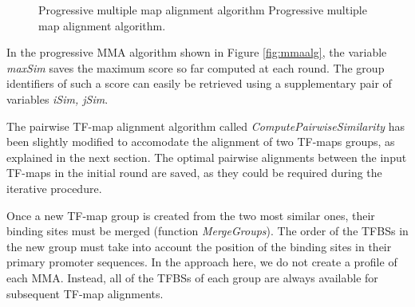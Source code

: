 \begin{figure}[t!]
\begin{center}
          {Progressive multiple map alignment algorithm}%
          {Progressive multiple map alignment algorithm.}%
          {}
\end{center}
\end{figure}



In the progressive MMA algorithm shown in Figure \ref{fig:mmaalg}, the variable \emph{maxSim}
saves the maximum score so far computed at each round. The group
identifiers of such a score can easily be retrieved using a supplementary
pair of variables \emph{iSim, jSim}.

The pairwise TF-map alignment algorithm called
\emph{ComputePairwiseSimilarity} \citep{blanco:2006b} has been slightly
modified to accomodate the alignment of two TF-maps groups, as explained in
the next section. The optimal pairwise alignments between the input TF-maps
in the initial round are saved, as they could be required during the
iterative procedure.

Once a new TF-map group is created from the two most similar ones, their
binding sites must be merged (function \emph{MergeGroups}). The order of
the TFBSs in the new group must take into account the position of the
binding sites in their primary promoter sequences. In the approach here, we
do not create a profile of each MMA. Instead, all of the TFBSs of each group
are always available for subsequent TF-map alignments.


